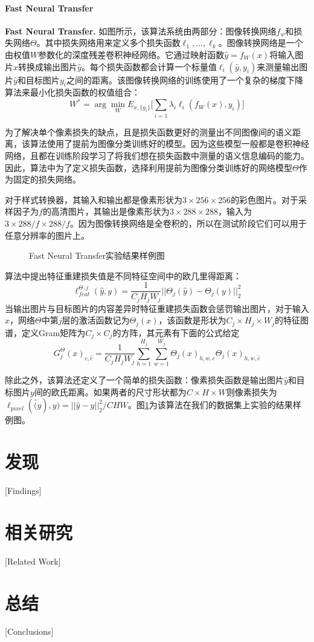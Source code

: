 
\subsubsection{Fast Neural Transfer}

\textbf{Fast Neural Transfer.}\cite{FNT} 如图所示，该算法系统由两部分：图像转换网络$f_w$和损失网络$\Theta$。其中损失网络用来定义多个损失函数$\ell_1,\dots,\ell_k$。图像转换网络是一个由权值$W$参数化的深度残差卷积神经网络。它通过映射函数$\hat{y}=f_W(x)$将输入图片$x$转换成输出图片$\hat{y}$。每个损失函数都会计算一个标量值$\ell_i(\hat{y},y_i)$来测量输出图片$\hat{y}$和目标图片$y_i$之间的距离。该图像转换网络的训练使用了一个复杂的梯度下降算法来最小化损失函数的权值组合：
$$W^*=\arg \min_W E_{x,\{y_i\}}\Big[\sum_{i=1}\lambda_i\ell_i(f_W(x),y_i)\Big]$$

为了解决单个像素损失的缺点，且是损失函数更好的测量出不同图像间的语义距离，该算法使用了提前为图像分类训练好的模型。因为这些模型一般都是卷积神经网络，且都在训练阶段学习了将我们想在损失函数中测量的语义信息编码的能力。因此，算法中为了定义损失函数，选择利用提前为图像分类训练好的网络模型$\Theta$作为固定的损失网络。

对于样式转换器，其输入和输出都是像素形状为$3\times 256 \times 256$的彩色图片。对于采样因子为$f$的高清图片，其输出是像素形状为$3\times288\times288$，输入为$3\times288/f\times288/f$。因为图像转换网络是全卷积的，所以在测试阶段它们可以用于任意分辨率的图片上。

\begin{figure}[t]
    \centering
    \caption{Fast Neural Transfer实验结果样例图}
    \label{fnt-result}
\end{figure}

算法中提出特征重建损失值是不同特征空间中的欧几里得距离：
$$\ell_{feat}^{\Theta,j}(\hat{y},y)=\frac{1}{C_jH_jW_j}||\Theta_j(\hat{y})-\Theta_j(y)||_2^2$$
当输出图片与目标图片的内容差异时特征重建损失函数会惩罚输出图片，对于输入$x$，网络$\Theta$中第$j$层的激活函数记为$\Theta_j(x)$，该函数是形状为$C_j\times H_j\times W_j$的特征图谱，定义Gram矩阵为$C_j\times C_j$的方阵，其元素有下面的公式给定
$$G_j^{\Theta}(x)_{c,\hat{c}}=\frac{1}{C_jH_jW_j}\sum_{h=1}^{H_j}\sum_{w=1}^{W_j}\Theta_j(x)_{h,w,c}\Theta_j(x)_{h,w,\hat{c}}$$

除此之外，该算法还定义了一个简单的损失函数：像素损失函数是输出图片$\hat{y}$和目标图片$y$间的欧氏距离。如果两者的尺寸形状都为$C\times H\times W$则像素损失为$\ell_{pixel}(\hat(y),y)=||\hat{y}-y||_2^2/CHW$。图\ref{fnt-result}为该算法在我们的数据集上实验的结果样例图。

\chapter{发现}[Findings]

\chapter{相关研究}[Related Work]

\chapter{总结}[Conclusions]